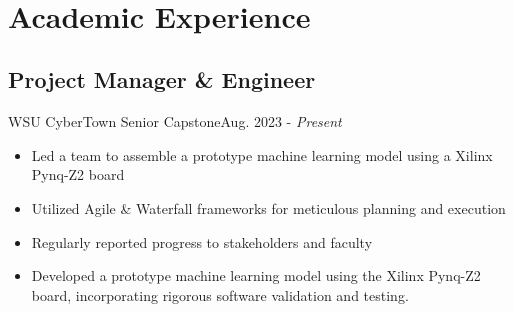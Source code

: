 \\ \section{Academic Experience}
\subsection{Project Manager \& Engineer}{WSU CyberTown Senior Capstone}{Aug. 2023 - \textit{Present}}
\begin{itemize}
    \item Led a team to assemble a prototype machine learning model using a Xilinx Pynq-Z2 board
    \item Utilized Agile \& Waterfall frameworks for meticulous planning and execution
    \item Regularly reported progress to stakeholders and faculty
    \item Developed a prototype machine learning model using the Xilinx Pynq-Z2 board, incorporating rigorous software validation and testing.
\end{itemize}

